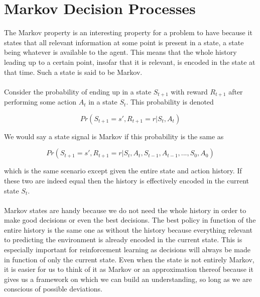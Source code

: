 \section{Markov Decision Processes}
The Markov property is an interesting property for a problem to have
because it states that all relevant information at some point
is present in a state, a state being whatever is available to the agent.
This means that the whole history leading up to a certain point,
insofar that it is relevant,
is encoded in the state at that time. 
Such a state is said to be Markov.

\paragraph{}
Consider the probability of ending up in a state $S_{t+1}$
with reward $R_{t+1}$
after performing some action $A_t$
in a state $S_t$.
This probability is denoted

\begin{equation}
  Pr(S_{t+1}=s', R_{t+1}=r | S_t, A_t)
\end{equation}

We would say a state signal is Markov if this probability is the same as

\begin{equation}
  Pr(S_{t+1}=s', R_{t+1}=r | S_t, A_t, S_{t-1}, A_{t-1},..., S_0, A_0)
\end{equation}

which is the same scenario except given the entire state and action history.
If these two are indeed equal
then the history is effectively encoded in the current state $S_t$.

\paragraph{}
Markov states are handy because we do not need the whole history
in order to make good decisions or even the best decisions.
The best policy in function of the entire history
is the same one as without the history
because everything relevant to predicting the environment
is already encoded in the current state.
This is especially important for reinforcement learning
as decisions will always be made in function of only the current state.
Even when the state is not entirely Markov,
it is easier for us to think of it as Markov
or an approximation thereof
because it gives us a framework on which
we can build an understanding,
so long as we are conscious of possible deviations.

